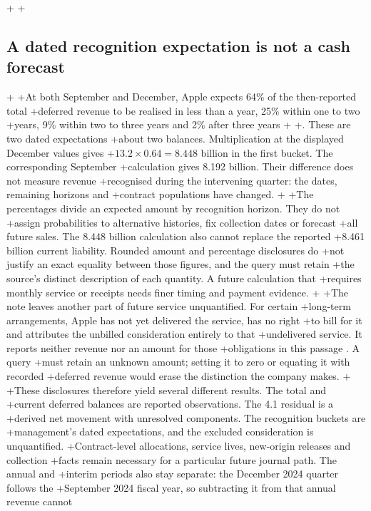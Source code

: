 +
+\subsection{A dated recognition expectation is not a cash forecast}
+
+At both September and December, Apple expects 64\% of the then-reported total
+deferred revenue to be realised in less than a year, 25\% within one to two
+years, 9\% within two to three years and 2\% after three years
+\citep[Note 2, printed p.~36]{apple2024}
+\citep[Note 2, printed p.~6]{apple2025q1}. These are two dated expectations
+about two balances. Multiplication at the displayed December values gives
+$13.2\times0.64=8.448$ billion in the first bucket. The corresponding September
+calculation gives 8.192 billion. Their difference does not measure revenue
+recognised during the intervening quarter: the dates, remaining horizons and
+contract populations have changed.
+
+The percentages divide an expected amount by recognition horizon. They do not
+assign probabilities to alternative histories, fix collection dates or forecast
+all future sales. The 8.448 billion calculation also cannot replace the reported
+8.461 billion current liability. Rounded amount and percentage disclosures do
+not justify an exact equality between those figures, and the query must retain
+the source's distinct description of each quantity. A future calculation that
+requires monthly service or receipts needs finer timing and payment evidence.
+
+The note leaves another part of future service unquantified. For certain
+long-term arrangements, Apple has not yet delivered the service, has no right
+to bill for it and attributes the unbilled consideration entirely to that
+undelivered service. It reports neither revenue nor an amount for those
+obligations in this passage \citep[Note 2, printed p.~35]{apple2024}. A query
+must retain an unknown amount; setting it to zero or equating it with recorded
+deferred revenue would erase the distinction the company makes.
+
+These disclosures therefore yield several different results. The total and
+current deferred balances are reported observations. The 4.1 residual is a
+derived net movement with unresolved components. The recognition buckets are
+management's dated expectations, and the excluded consideration is unquantified.
+Contract-level allocations, service lives, new-origin releases and collection
+facts remain necessary for a particular future journal path. The annual and
+interim periods also stay separate: the December 2024 quarter follows the
+September 2024 fiscal year, so subtracting it from that annual revenue cannot
